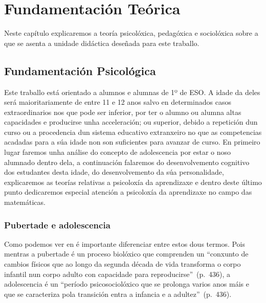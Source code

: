 \chapter{Fundamentación Teórica}\label{chap:fundamentacion}
Neste capítulo explicaremos a teoría psicolóxica, pedagóxica e sociolóxica sobre a que se asenta a unidade didáctica deseñada para este traballo.

\section{Fundamentación Psicológica}
Este traballo está orientado a alumnos e alumnas de 1º de ESO. A idade da deles será maioritariamente de entre 11 e 12 anos salvo en determinados casos extraordinarios nos que pode ser inferior, por ter o alumno ou alumna altas capacidades e producirse unha acceleración; ou superior, debido a repetición dun curso ou a procedencia dun sistema educativo extranxeiro no que as competencias acadadas para a súa idade non son suficientes para avanzar de curso. En primeiro lugar faremos unha análise do concepto de adolescencia por estar o noso alumnado dentro dela, a continuación falaremos do desenvolvemento cognitivo dos estudantes desta idade, do desenvolvemento da súa personalidade, explicaremos as teorías relativas a psicoloxía da aprendizaxe e dentro deste último punto dedicaremos especial atención a psicoloxía da aprendizaxe no campo das matemáticas.

\subsection{Pubertade e adolescencia}
Como podemos ver en  é importante diferenciar entre estos dous termos. Pois mentras a pubertade é un proceso biolóxico que comprenden un ``conxunto de cambios físicos que ao longo da segunda década de vida transforma o corpo infantil nun corpo adulto con capacidade para reproducirse''~(p.~436), a adolescencia é un ``período psicosociolóxico que se prolonga varios anos máis e que se caracteriza pola transición entra a infancia e a adultez''~(p.~436).

